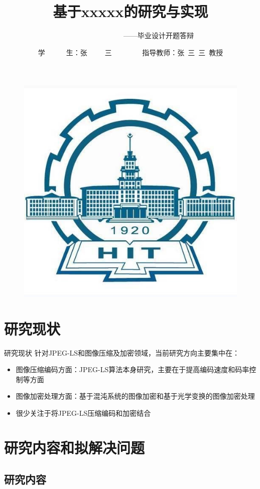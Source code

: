 \documentclass{beamer}
\author[张三]{学~~~~~~生：张~~~~~三~~~~~~~~\vskip 5pt 指导教师：张~三~三~教授}
\title{基于xxxxx的研究与实现}
\subtitle{~~~~~~~~~~~~~~~~——毕业设计开题答辩}
\institute[哈尔滨工业大学~计算机科学与技术学院]{\small \vskip 45pt哈尔滨工业大学~计算机科学与技术学院}
\date{\small \vskip -17pt二〇二一年六月}
\begin{document}
\kaishu
\begin{frame}
    \vspace{-15mm}
    \titlepage
    \vspace{-43mm}
    \begin{figure}[htbp]
      \begin{center}
        \includegraphics[width=0.16\linewidth]{pic/hit.jpeg}
      \end{center}
    \end{figure}
\end{frame}

\begin{frame}
    \tableofcontents[sectionstyle=show,subsectionstyle=show/shaded/hide,subsubsectionstyle=show/shaded/hide]
\end{frame}



\section{研究现状}
\begin{frame}{研究现状}
    针对JPEG-LS和图像压缩及加密领域，当前研究方向主要集中在：
    \begin{itemize}[<+-| alert@+>] %
        \item 图像压缩编码方面：JPEG-LS算法本身研究，主要在于提高编码速度和码率控制等方面
        \item 图像加密处理方面：基于混沌系统的图像加密和基于光学变换的图像加密处理
        \item 很少关注于将JPEG-LS压缩编码和加密结合
    \end{itemize}
\end{frame}


\section{研究内容和拟解决问题}

\subsection{研究内容}
\end{document}
